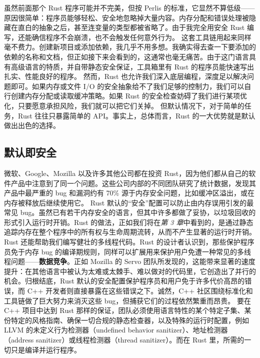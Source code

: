 虽然前面那个 Rust 程序可能并不完美，但按 Perlis 的标准，它显然不算低级——原因很简单：程序员能够轻松、安全地忽略掉大量内容。内存分配和错误处理被隐藏在直白的抽象之后，甚至连变量的类型都被省略了。由于我完全用安全 Rust 编写，还能确信程序不会崩溃，也不会触发任何意外行为。
这套工具链用起来同样毫不费力。创建新项目或添加依赖，我几乎不用多想。我确实得去查一下要添加的依赖的名称和文档，但正如接下来会看到的，这通常也毫无痛苦。由于这门语言具有高级语言的特质，并自带静态安全保证，工具箱里有 Rust 的程序员能快速写出扎实、性能良好的程序。
\label{idx:idx_a04aa939}
然而，Rust 也允许我们深入底层编程，深度足以解决问题即可。如果内存或文件 I/\allowbreak{}O 的安全抽象给不了我们足够的控制力，我们可以自行创建内存分配或读取缓冲策略。如果 Rust 的安全检查妨碍了我们进行某项优化，只要愿意承担风险，我们就可以把它们关掉。
但默认情况下，对于简单的任务，Rust 往往只暴露简单的 API。事实上，总体而言，Rust 的一大优势就是默认做出出色的选择。
\subsection{默认即安全}
\label{idx:idx_8161d7e1}
微软、Google、Mozilla 以及许多其他公司都在投资 Rust，因为他们都从自己的软件产品中注意到了同一个问题。这些公司内部的不同团队研究了统计数据，发现其产品中最严重的 bug 和漏洞约有 70\% 源于内存安全问题，比如缓冲区溢出，或在内存被释放后继续使用它。
Rust 默认的“安全”配置可以防止由内存误用引发的最常见 bug。虽然已有若干内存安全的语言，但其中许多都做了妥协，以垃圾回收的形式引入运行时开销。Rust 的做法，正如我们将在\emph{第 3 章}中看到的，是通过静态追踪内存在整个程序中的所有权与生命周期流转，从而不产生显著的运行时开销。
Rust 还能帮助我们编写健壮的多线程代码。Rust 的设计者认识到，那些保护程序员免于内存 bug 的编译期规则，同样可以扩展用来保护用户免遭一种常见的多线程问题——\textbf{数据竞争}。正如 Mozilla 的 Servo 团队所发现的，这能带来显著的速度提升：在其他语言中被认为太难或太棘手、难以做对的代码里，它创造出了并行的机会。归根结底，Rust 默认的安全配置保护程序员和用户免于许多代价高昂的错误，而 C++ 开发者则直接暴露在这些错误之下。诚然，C++ 社区围绕标准化和工具链做了巨大努力来消灭这些 bug，但捕获它们的过程依然繁重而昂贵。
\label{idx:idx_968db591}
要在 C++ 项目中达到 Rust 那样的保证，团队必须使用语言特性的某个特定子集、某份特定的风格指南、确保一切合规的静态检查器，以及特殊的运行时配置，例如 LLVM 的未定义行为检测器（undefined behavior sanitizer）、地址检测器（address sanitizer）或线程检测器（thread sanitizer）。而在 Rust 里，所需的一切只是编译并运行程序。
